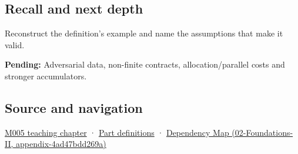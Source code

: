\subsection{Recall and next depth}\label{appendix-df318da57389-recall-and-next-depth}

Reconstruct the definition's example and name the assumptions that make it valid.

\textbf{Pending:} Adversarial data, non-finite contracts, allocation/parallel costs and stronger accumulators.

\subsection{Source and navigation}\label{appendix-df318da57389-source-and-navigation}

\hyperref[01-foundations-i-ch001-when-arithmetic-meets-uncertainty]{M005 teaching chapter} · \hyperref[appendix-fd090d982a15-m005---parts-77-88]{Part definitions} · \href{../02-Foundations-II/main.pdf\#nameddest=appendix-4ad47bdd269a}{Dependency Map (02-Foundations-II, appendix-4ad47bdd269a)}
